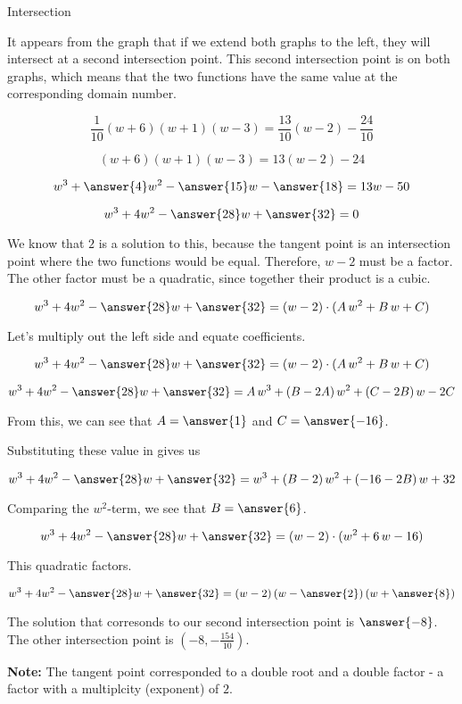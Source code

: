 \documentclass{ximera}
\begin{document}
\begin{exercise} Intersection

It appears from the graph that if we extend both graphs to the left, they will intersect at a second intersection point.  This second intersection point is on both graphs, which means that the two functions have the same value at the corresponding domain number.


\[
\frac{1}{10} (w+6) (w+1) (w-3) = \frac{13}{10} (w-2) -\frac{24}{10}
\]



\[
(w+6) (w+1) (w-3) = 13 (w-2) - 24
\]



\[
w^3 + \answer{4} w^2 - \answer{15} w - \answer{18} = 13 w - 50
\]


\[
w^3 + 4 w^2 - \answer{28} w + \answer{32} = 0
\]


We know that $2$ is a solution to this, because the tangent point is an intersection point where the two functions would be equal.  Therefore, $w-2$ must be a factor.  The other factor must be a quadratic, since together their product is a cubic.



\[
w^3 + 4 w^2 - \answer{28} w + \answer{32} = (w - 2) \cdot (A \, w^2 + B \, w + C)
\]


Let's multiply out the left side and equate coefficients.


\[
w^3 + 4 w^2 - \answer{28} w + \answer{32} = (w - 2) \cdot (A \, w^2 + B \, w + C)
\]


\[
w^3 + 4 w^2 - \answer{28} w + \answer{32} = A \, w^3 + (B - 2A) \, w^2 + (C - 2B) \, w - 2C
\]


From this, we can see that   $A = \answer{1}$ and $C = \answer{-16}$.

Substituting these value in gives us



\[
w^3 + 4 w^2 - \answer{28} w + \answer{32} = w^3 + (B - 2) \, w^2 + (-16 - 2B) \, w + 32
\]


Comparing the $w^2$-term, we see that $B = \answer{6}$.






\[
w^3 + 4 w^2 - \answer{28} w + \answer{32} = (w - 2) \cdot (w^2 + 6 \, w - 16)
\]


This quadratic factors.



\[
w^3 + 4 w^2 - \answer{28} w + \answer{32} = (w - 2) \left( w - \answer{2} \right) \left( w + \answer{8} \right)
\]



The solution that corresonds to our second intersection point is $\answer{-8}$. \\

The other intersection point is $\left( -8, -\frac{154}{10} \right)$.



\end{exercise}


\textbf{Note:}  The tangent point corresponded to a double root and a double factor - a factor with a multiplcity (exponent) of $2$.
\end{document}

